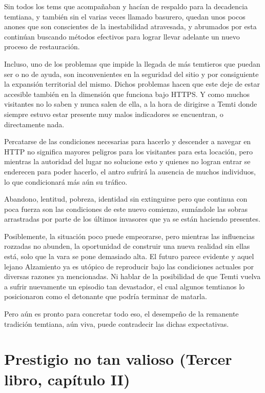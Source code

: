 \documentclass[
]{book}
\begin{document}
Sin todos los tems que acompañaban y hacían de respaldo para la decadencia temtiana, y también sin el varias veces llamado basurero, quedan unos pocos anones que son conscientes de la inestabilidad atravesada, y abrumados por esta continúan buscando métodos efectivos para lograr llevar adelante un nuevo proceso de restauración.

Incluso, uno de los problemas que impide la llegada de más temtieros que puedan ser o no de ayuda, son inconvenientes en la seguridad del sitio y por consiguiente la expansión territorial del mismo. Dichos problemas hacen que este deje de estar accesible también en la dimensión que funciona bajo HTTPS. Y como muchos visitantes no lo saben y nunca salen de ella, a la hora de dirigirse a Temti donde siempre estuvo estar presente muy malos indicadores se encuentran, o directamente nada.

Percatarse de las condiciones necesarias para hacerlo y descender a navegar en HTTP no significa mayores peligros para los visitantes para esta locación, pero mientras la autoridad del lugar no solucione esto y quienes no logran entrar se enderecen para poder hacerlo, el antro sufrirá la ausencia de muchos individuos, lo que condicionará más aún su tráfico.

Abandono, lentitud, pobreza, identidad sin extinguirse pero que continua con poca fuerza son las condiciones de este nuevo comienzo, sumándole las sobras arrastradas por parte de los últimos invasores que ya se están haciendo presentes.

Posiblemente, la situación poco puede empeorarse, pero mientras las influencias rozzadas no abunden, la oportunidad de construir una nueva realidad sin ellas está, solo que la vara se pone demasiado alta. El futuro parece evidente y aquel lejano Alzamiento ya es utópico de reproducir bajo las condiciones actuales por diversas razones ya mencionadas. Ni hablar de la posibilidad de que Temti vuelva a sufrir nuevamente un episodio tan devastador, el cual algunos temtianos lo posicionaron como el detonante que podría terminar de matarla.

Pero aún es pronto para concretar todo eso, el desempeño de la remanente tradición temtiana, aún viva, puede contradecir las dichas expectativas.

\hypertarget{prestigio-no-tan-valioso-tercer-libro-capuxedtulo-ii}{%
\section{Prestigio no tan valioso (Tercer libro, capítulo II)}\label{prestigio-no-tan-valioso-tercer-libro-capuxedtulo-ii}}
\end{document}
